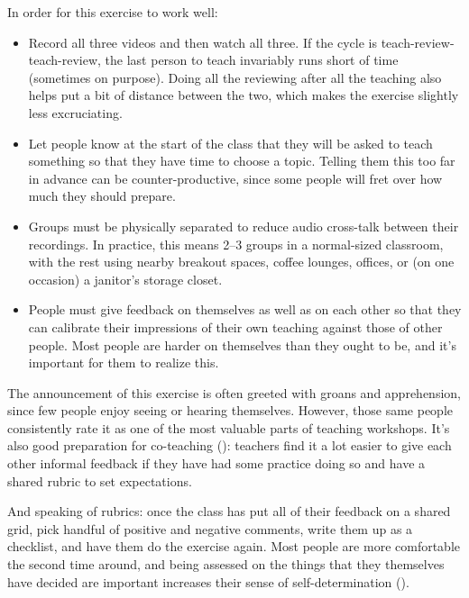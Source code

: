 In order for this exercise to work well:

\begin{itemize}

\item
  Record all three videos and then watch all three.
  If the cycle is teach-review-teach-review,
  the last person to teach invariably runs short of time
  (sometimes on purpose).
  Doing all the reviewing after all the teaching
  also helps put a bit of distance between the two,
  which makes the exercise slightly less excruciating.

\item
  Let people know at the start of the class that they will be asked to teach something
  so that they have time to choose a topic.
  Telling them this too far in advance can be counter-productive,
  since some people will fret over how much they should prepare.

\item
  Groups must be physically separated to reduce audio cross-talk between their recordings.
  In practice,
  this means 2--3 groups in a normal-sized classroom,
  with the rest using nearby breakout spaces, coffee lounges, offices,
  or (on one occasion) a janitor's storage closet.

\item
  People must give feedback on themselves as well as on each other
  so that they can calibrate their impressions of their own teaching
  against those of other people.
  Most people are harder on themselves than they ought to be,
  and it's important for them to realize this.

\end{itemize}

The announcement of this exercise is often greeted with groans and apprehension,
since few people enjoy seeing or hearing themselves.
However,
those same people consistently rate it as one of the most valuable parts of teaching workshops.
It's also good preparation for co-teaching ():
teachers find it a lot easier to give each other informal feedback
if they have had some practice doing so
and have a shared rubric to set expectations.

And speaking of rubrics:
once the class has put all of their feedback on a shared grid,
pick handful of positive and negative comments,
write them up as a checklist,
and have them do the exercise again.
Most people are more comfortable the second time around,
and being assessed on the things that they themselves have decided are important
increases their sense of self-determination ().

